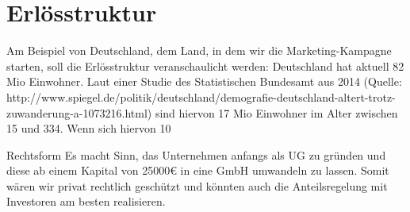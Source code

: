 \section{Erlösstruktur}
Am Beispiel von Deutschland, dem Land, in dem wir die Marketing-Kampagne starten, soll die Erlösstruktur veranschaulicht werden:
Deutschland hat aktuell 82 Mio Einwohner. Laut einer Studie des Statistischen Bundesamt aus 2014 (Quelle: http://www.spiegel.de/politik/deutschland/demografie-deutschland-altert-trotz-zuwanderung-a-1073216.html) sind hiervon 17 Mio Einwohner im Alter zwischen 15 und 334. Wenn sich hiervon 10%


Rechtsform
Es macht Sinn, das Unternehmen anfangs als UG zu gründen und diese ab einem Kapital von 25000€ in eine GmbH umwandeln zu lassen. Somit wären wir privat rechtlich geschützt und könnten auch die Anteilsregelung mit Investoren am besten realisieren.

